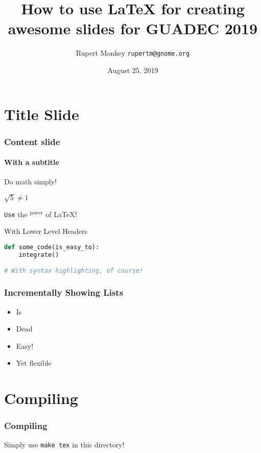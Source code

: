 \documentclass[aspectratio=43]{beamer}
\title[How to use \LaTeX{} for GUADEC 2018]{How to use \LaTeX{} for creating awesome slides for GUADEC 2019}
\author{Rupert Monkey \texttt{rupertm@gnome.org}}
\date{August 25, 2019}
\begin{document}
\begin{frame}
\titlepage
\end{frame}

\section{Title Slide}

\begin{frame}[containsverbatim]
\frametitle{Content slide}
\framesubtitle{With a subtitle}

    Do math simply!

    \begin{center}
        $\sqrt{5} \neq 1$
    \end{center}

    \texttt{Use} the $^\text{power}$ of \LaTeX!

    \begin{block}{With Lower Level Headers}
        \begin{lstlisting}[language=Python]
def some_code(is_easy_to):
    integrate()

# With syntax highlighting, of course!
        \end{lstlisting}
    \end{block}
\end{frame}

\begin{frame}
\frametitle{Incrementally Showing Lists}

    \begin{itemize}
        \item<1-> Is
        \item<2-| alert@2> Dead
        \item<3-> Easy!
        \item<1-> Yet flexible
    \end{itemize}
\end{frame}

\section{Compiling}

\begin{frame}
\frametitle{Compiling}

    Simply use \texttt{make tex} in this directory!
\end{frame}
\end{document}
